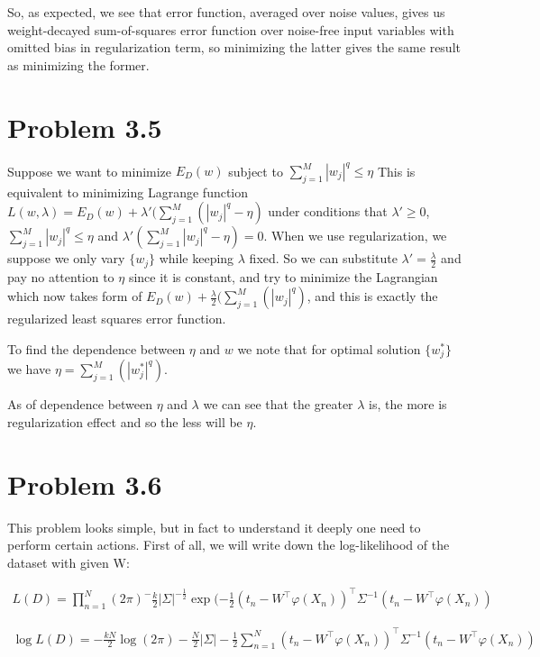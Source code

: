 \documentclass[fleqn]{article}
\begin{document}
So, as expected, we see that error function, averaged over noise values, gives us weight-decayed sum-of-squares error function over noise-free input variables with omitted bias in regularization term, so minimizing the latter gives the same result as minimizing the former.  

\section*{Problem 3.5}

Suppose we want to minimize $E_D(w)$ subject to $\sum\limits_{j=1}^M|w_j|^q \le \eta$
This is equivalent to minimizing Lagrange function $L(w, \lambda) = E_D(w) + \lambda'(\sum\limits_{j=1}^M(|w_j|^q - \eta)$ under conditions that $\lambda' \ge 0$, $\sum\limits_{j=1}^M|w_j|^q \le \eta$ and $\lambda'(\sum\limits_{j=1}^M|w_j|^q - \eta) = 0$. When we use regularization, we suppose we only vary $\{w_j\}$ while keeping $\lambda$ fixed. So we can substitute $\lambda' = \frac{\lambda}{2}$ and pay no attention to $\eta$ since it is constant, and try to minimize the Lagrangian which now takes form of $E_D(w) + \frac{\lambda}{2}(\sum\limits_{j=1}^M(|w_j|^q)$, and this is exactly the regularized least squares error function. 

To find the dependence between $\eta$ and $w$ we note that for optimal solution $\{w_j^*\}$ we have $\eta = \sum\limits_{j=1}^M(|w_j^*|^q)$.

As of dependence between $\eta$ and $\lambda$ we can see that the greater $\lambda$ is, the more is regularization effect and so the less will be $\eta$. 

\section*{Problem 3.6}

This problem looks simple, but in fact to understand it deeply one need to perform certain actions. First of all, we will write down the log-likelihood of the dataset with given W:

\begin{align}
L(D) = \prod\limits_{n=1}^N (2\pi)^-{\frac{k}{2}}|\Sigma|^{-\frac{1}{2}}\exp(-\frac{1}{2}(t_n - W^\top\varphi(X_n))^\top\Sigma^{-1}(t_n - W^\top\varphi(X_n))
\end{align}

\begin{align}
\log L(D) = -\frac{kN}{2}\log(2\pi) -\frac{N}{2}|\Sigma| - \frac{1}{2} \sum\limits_{n=1}^N(t_n - W^\top\varphi(X_n))^\top\Sigma^{-1}(t_n - W^\top\varphi(X_n))
\end{align}
\end{document}
